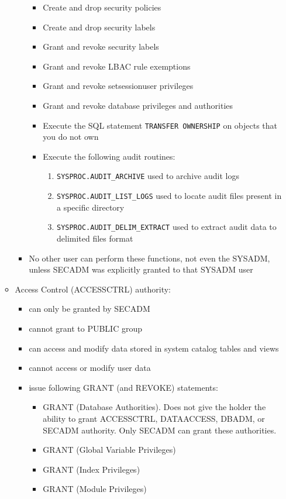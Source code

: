 \documentclass{article}
\begin{document}
\begin{itemize}
\begin{itemize}
\begin{itemize}
\begin{itemize}
		\item Create and drop security policies
		\item Create and drop security labels
		\item Grant and revoke security labels
		\item Grant and revoke LBAC rule exemptions
		\item Grant and revoke setsessionuser privileges
		\item Grant and revoke database privileges and authorities
		\item Execute the SQL statement \texttt{TRANSFER OWNERSHIP} on objects that you do not own
		\item Execute the following audit routines:
			\begin{enumerate}
			\item \texttt{SYSPROC.AUDIT\_ARCHIVE} used to archive audit logs
			\item \texttt{SYSPROC.AUDIT\_LIST\_LOGS} used to locate audit files present in a specific
			directory
			\item \texttt{SYSPROC.AUDIT\_DELIM\_EXTRACT} used to extract audit data to delimited files 
			format
			\end{enumerate}
		\end{itemize}
	\item No other user can perform these functions, not even the SYSADM, unless SECADM was 
	explicitly granted to that SYSADM user
	\end{itemize}
\item Access Control (ACCESSCTRL) authority:
	\begin{itemize}
	\item can only be granted by SECADM
	\item cannot grant to PUBLIC group
	\item can access and modify data stored in system catalog tables and views
	\item cannot access or modify user data
	\item issue following GRANT (and REVOKE) statements:
		\begin{itemize}
		\item GRANT (Database Authorities). Does not give the holder the ability to grant ACCESSCTRL,
		DATAACCESS, DBADM, or SECADM authority. Only SECADM can grant these authorities.
		\item GRANT (Global Variable Privileges)
		\item GRANT (Index Privileges)
		\item GRANT (Module Privileges)

\end{itemize}
\end{itemize}
\end{itemize}
\end{itemize}
\end{document}
